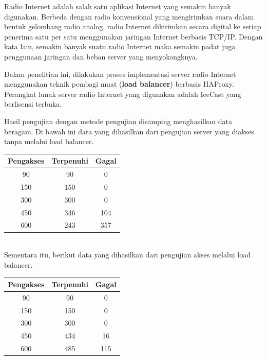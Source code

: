 \documentclass[a0,portrait]{a0poster}
\begin{document}
\begin{multicols}{2}
\LARGE
\begin{tcolorbox}[colback=blue!5!white,colframe=blue!75!black,title=Pendahuluan]
Radio Internet adalah salah satu aplikasi Internet yang semakin banyak digunakan. Berbeda dengan radio konvensional yang mengirimkan suara dalam bentuk gelombang radio analog, radio Internet dikirimkan secara digital ke setiap penerima satu per satu menggunakan jaringan Internet berbasis TCP/IP. Dengan kata lain, semakin banyak suatu radio Internet maka semakin padat juga penggunaan jaringan dan beban server yang menyokongknya.

Dalam penelitian ini, dilakukan proses implementasi server radio Internet menggunakan teknik pembagi muat (\textbf{load balancer}) berbasis HAProxy. Perangkat lunak server radio Internet yang digunakan adalah IceCast yang berlisensi terbuka.
\end{tcolorbox}

\begin{tcolorbox}[colback=blue!5!white,colframe=blue!75!black,title=Pengujian]
	Hasil pengujian dengan metode pengujian disamping menghasilkan data beragam. Di bawah ini data yang dihasilkan dari pengujian server yang diakses tanpa melalui load balancer.
	\ \\
	\begin{center}
		\begin{tabular}{|c|c|c|}
			\hline
			\textbf{Pengakses} & \textbf{Terpenuhi} & \textbf{Gagal} \\ \hline
			90 & 90 & 0 \\ \hline
			150 & 150 & 0 \\ \hline
			300 & 300 & 0 \\ \hline
			450 & 346 & 104 \\ \hline
			600 & 243 & 357 \\ \hline
		\end{tabular}
	\end{center}
	\ \\
	Sementara itu, berikut data yang dihasilkan dari pengujian akses melalui load balancer.	
	\ \\
	
	\begin{center}
		\begin{tabular}{|c|c|c|}
			\hline
			\textbf{Pengakses} & \textbf{Terpenuhi} & \textbf{Gagal} \\ \hline
			90 & 90 & 0 \\ \hline
			150 & 150 & 0 \\ \hline
			300 & 300 & 0 \\ \hline
			450 & 434 & 16 \\ \hline
			600 & 485 & 115 \\ \hline
		\end{tabular}
	\end{center}
	

\end{tcolorbox}
\end{multicols}
\end{document}
